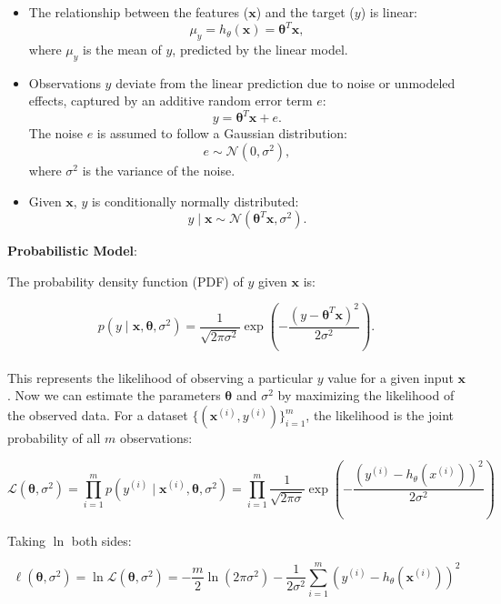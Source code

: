 \begin{itemize}
    \item The relationship between the features (\(\mathbf{x}\)) and the target (\(y\)) is linear:
     \[
     \mu_y = h_\theta(\mathbf{x}) = \boldsymbol{\theta}^T \mathbf{x},
     \]
     where \( \mu_y \) is the mean of \(y\), predicted by the linear model.
    \item Observations \(y\) deviate from the linear prediction due to noise or unmodeled effects, captured by an additive random error term \(e\):
     \[
     y = \boldsymbol{\theta}^T \mathbf{x} + e.
     \]
   The noise \(e\) is assumed to follow a Gaussian distribution:
     \[
     e \sim \mathcal{N}(0, \sigma^2),
     \]
     where \(\sigma^2\) is the variance of the noise.
    \item Given \(\mathbf{x}\), \(y\) is conditionally normally distributed:
     \[
     y \mid \mathbf{x} \sim \mathcal{N}(\boldsymbol{\theta}^T \mathbf{x}, \sigma^2).
     \]
\end{itemize}

\noindent
\textbf{Probabilistic Model}:

The probability density function (PDF) of \(y\) given \(\mathbf{x}\) is:

\begin{equation}
p(y \mid \mathbf{x}, \boldsymbol{\theta}, \sigma^2) = \frac{1}{\sqrt{2 \pi \sigma^2}} \exp\left(-\frac{(y -
\boldsymbol{\theta}^T \mathbf{x})^2}{2\sigma^2}\right).
\end{equation}
\\

This represents the likelihood of observing a particular \(y\) value for a given input \(\mathbf{x}\). Now we can estimate the parameters \(\boldsymbol{\theta}\) and \(\sigma^2\) by maximizing the likelihood of the
observed data. For a dataset \(\{(\mathbf{x}^{(i)}, y^{(i)})\}_{i=1}^m\), the likelihood is the joint probability of all $m$ observations:

\begin{equation}
    \mathcal{L}(\boldsymbol{\theta}, \sigma^2) = \prod_{i=1}^m p(y^{(i)} \mid \mathbf{x}^{(i)}, \boldsymbol{\theta}, \sigma^2)
    = \prod_{i=1}^m \frac{1}{\sqrt{2 \pi \sigma}} \exp\left(-\frac{\left(y^{(i)} - h_\theta\left(x^{(i)}\right)\right)^2}{2 \sigma^2}\right)
\end{equation}

Taking $\ln$ both sides:

\begin{equation}
    \ell(\boldsymbol{\theta}, \sigma^2) = \ln \mathcal{L}(\boldsymbol{\theta}, \sigma^2)
= -\frac{m}{2} \ln(2\pi\sigma^2) - \frac{1}{2\sigma^2} \sum_{i=1}^m \left( y^{(i)} - h_\theta\left(\mathbf{x}^{(i)}\right) \right)^2
\end{equation}


